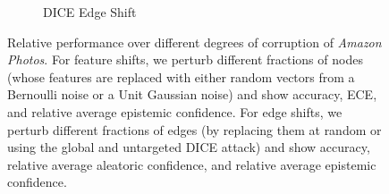 \begin{figure}
\begin{subfigure}{\textwidth}
        \caption{DICE \citep{Waniek2018} Edge Shift}
    \end{subfigure}
    \caption{Relative performance over different degrees of corruption of \emph{Amazon Photos}. For feature shifts, we perturb different fractions of nodes (whose features are replaced with either random vectors from a Bernoulli noise or a Unit Gaussian noise) and show accuracy, ECE, and relative average epistemic confidence. For edge shifts, we perturb different fractions of edges (by replacing them at random or using the global and untargeted DICE \citep{Waniek2018} attack) and show accuracy, relative average aleatoric confidence, and relative average epistemic confidence.}
    \label{fig:shift-amazon-photos}
\end{figure}